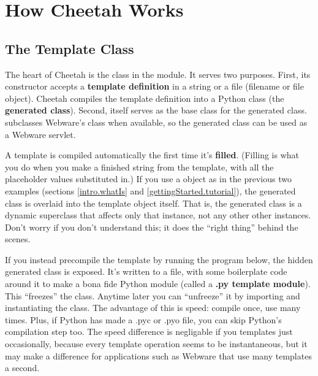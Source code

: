 \section{How Cheetah Works}
\label{howWorks}

\subsection{The Template Class}
\label{howWorks.templateClass}

The heart of Cheetah is the  class in the
 module. It serves two purposes. First, its constructor
accepts a {\bf template definition} in a string or a file (filename or file
object).  Cheetah compiles the template definition into a Python class (the
{\bf generated class}). Second,  itself serves as the base class
for the generated class.   subclasses Webware's
 class when available, so the generated class can be used
as a Webware servlet.

A template is compiled automatically the first time it's {\bf filled}.
(Filling is what you do when you make a finished string from the template,
with all the placeholder values substituted in.) If you use a 
object as in the previous two examples (sections \ref{intro.whatIs} and
\ref{gettingStarted.tutorial}), the generated class is overlaid into the
template object itself.  That is, the generated class is a dynamic superclass
that affects only that  instance, not any other other
 instances.  Don't worry if you don't understand this; 
it does the ``right thing'' behind the scenes.

If you instead precompile the template by running the 
program below, the hidden generated class is exposed.  It's written to a
file, with some boilerplate code around it to make a bona fide Python module
(called a {\bf .py template module}).  This ``freezes'' the class.  Anytime
later you can ``unfreeze'' it by importing and instantiating the class.  The 
advantage of this is speed: compile once, use many times.  Plus, if Python
has made a .pyc or .pyo file, you can skip Python's compilation step too.
The speed difference is negligable if you templates just occasionally,
because every template operation seems to be instantaneous, but it may make a
difference for applications such as Webware that use many templates a second.

